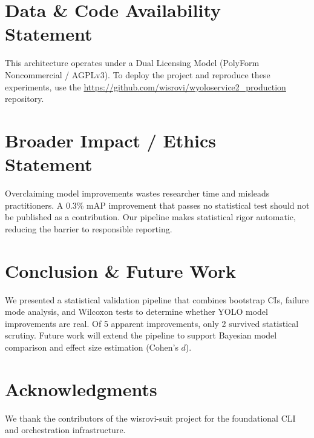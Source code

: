 \documentclass[10pt,twocolumn,letterpaper]{article}
\begin{document}
\section{Data \& Code Availability Statement}
This architecture operates under a Dual Licensing Model (PolyForm Noncommercial / AGPLv3). To deploy the project and reproduce these experiments, use the \url{https://github.com/wisrovi/wyoloservice2\_production} repository.

\section{Broader Impact / Ethics Statement}
Overclaiming model improvements wastes researcher time and misleads practitioners. A 0.3\% mAP improvement that passes no statistical test should not be published as a contribution. Our pipeline makes statistical rigor automatic, reducing the barrier to responsible reporting.

\section{Conclusion \& Future Work}
We presented a statistical validation pipeline that combines bootstrap CIs, failure mode analysis, and Wilcoxon tests to determine whether YOLO model improvements are real. Of 5 apparent improvements, only 2 survived statistical scrutiny. Future work will extend the pipeline to support Bayesian model comparison and effect size estimation (Cohen's $d$).

\section{Acknowledgments}
We thank the contributors of the wisrovi-suit project for the foundational CLI and orchestration infrastructure.



\end{document}
